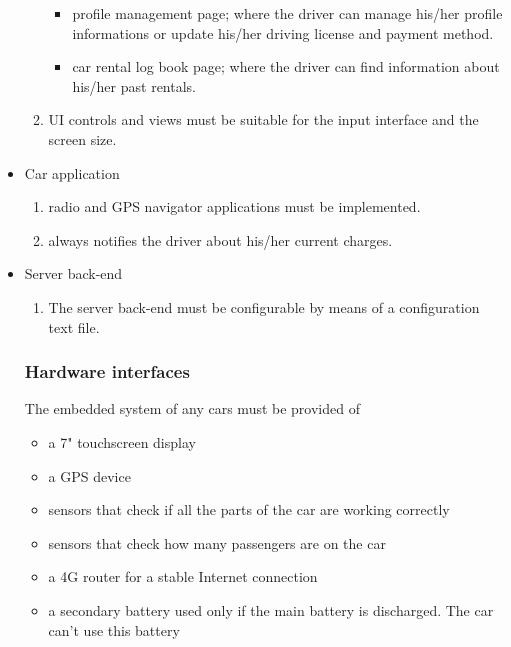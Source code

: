 \begin{itemize}
\begin{enumerate}
\begin{itemize}
					\item profile management page; where the driver can manage his/her profile informations or update his/her driving license and payment method.
					\item car rental log book page; where the driver can find information about his/her past rentals.
				\end{itemize}
			\item UI controls and views must be suitable for the input interface and the screen size.
		\end{enumerate}
	\item Car application
	\begin{enumerate}
		\item radio and GPS navigator applications must be implemented.
		\item always notifies the driver about his/her current charges.
	\end{enumerate}
	\item Server back-end
	\begin{enumerate}
		\item The server back-end must be configurable by means of a configuration text file.
	\end{enumerate}
	
\subsubsection{Hardware interfaces}
The embedded system of any cars must be provided of	
\begin{itemize}
	\item a 7" touchscreen display
	\item a GPS device
	\item sensors that check if all the parts of the car are working correctly
	\item sensors that check how many passengers are on the car
	\item a 4G router for a stable Internet connection
	\item a secondary battery used only if the main battery is discharged. The car can't use this battery
\end{itemize}


\end{itemize}
